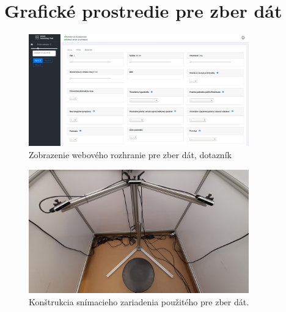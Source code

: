 \newpage
\section{Grafické prostredie pre zber dát} \label{sec:Priloha:HMI_WEB}

\begin{figure}[H]
	\centering
	\includegraphics[width=0.85\textwidth]{figures/hmi_web3.png}
	\caption{Zobrazenie webového rozhranie pre zber dát, dotazník}
	\label{fig:hmi_web:c}
\end{figure}

\begin{figure}[H]
	\centering
	\includegraphics[width=0.85\textwidth]{figures/clinic_scaning.png}
	\caption{Konštrukcia snímacieho zariadenia použitého pre zber dát.}
	\label{fig:hmi_web:d}
\end{figure}
